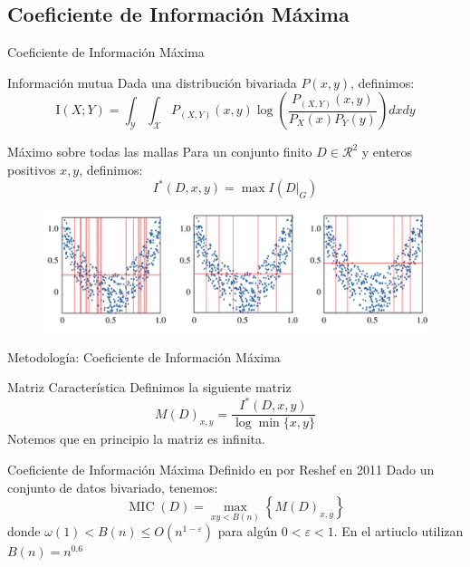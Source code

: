 \documentclass{beamer}
\begin{document}
\subsection{Coeficiente de Información Máxima}
\begin{frame}{Coeficiente de Información Máxima}
     
    
    \begin{block}{Información mutua}
    Dada una distribución bivariada $P(x,y)$, definimos:
        \begin{equation}
            \mathrm{I}(X ; Y)=\int_{\mathcal{Y}} \int_{\mathcal{X}} P_{(X, Y)}(x, y) \log \left(\frac{P_{(X, Y)}(x, y)}{P_{X}(x) P_{Y}(y)}\right)dxdy
        \end{equation}
    \end{block}
     


    \begin{block}{Máximo sobre todas las mallas}
        Para un conjunto finito $D\in\mathcal{R}  ^2$ y enteros positivos $x,y$, definimos:
		$$
		I^*(D,x,y)=\max I(D|_G)
		$$
    \end{block}
    \begin{figure}
        \centering
        \includegraphics[scale=0.6] {rsos201424f03.png}
    \end{figure}
\end{frame}

\begin{frame}{Metodología: Coeficiente de Información Máxima}
    \begin{block}{Matriz Característica}
        Definimos la siguiente matriz       
        \begin{equation}
	    	M(D)_{x, y}=\frac{I^{*}(D, x, y)}{\log \min \{x, y\}}
        \end{equation}
        Notemos que en principio la matriz es infinita.
    \end{block}
     

    \begin{block}{Coeficiente de Información Máxima}
        Definido en por Reshef en 2011 \cite{reshef2011} Dado un conjunto de datos bivariado, tenemos:
        \begin{equation}
	    	\operatorname{MIC}(D)=\max _{x y<B(n)}\left\{M(D)_{x, y}\right\}
        \end{equation}
        donde $\omega(1)<B(n) \leq O\left(n^{1-\varepsilon}\right)$ para alg\'un $0<\varepsilon<1$. En el artiuclo utilizan $B(n)=n^{0.6}$
    \end{block}
\end{frame}
\end{document}
